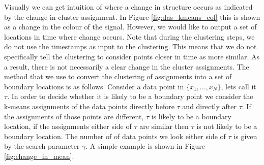Visually we can get intuition of where a change in structure occurs as indicated by the change in cluster assignment. In Figure \ref{fig:das_kmeans_col} this is shown as a change in the colour of the signal. However, we would like to output a set of locations in time where change occurs. Note that during the clustering steps, we do not use the timestamps as input to the clustering. This means that we do not specifically tell the clustering to consider points closer in time as more similar. As a result, there is not necessarily a clear change in the cluster assignments.
The method that we use to convert the clustering of assignments into a set of boundary locations is as follows. Consider a data point in $\{ x_1, ..., x_N \}$, lets call it $\tau$. In order to decide whether it is likely to be a boundary point we consider the k-means assignments of the data points directly before $\tau$ and directly after $\tau$. If the assignments of those points are different, $\tau$ is likely to be a boundary location, if the assignments either side of $\tau$ are similar then $\tau$ is not likely to be a boundary location. The number of of data points we look either side of $\tau$ is given by the search parameter $\gamma$. A simple example is shown in Figure \ref{fig:change_in_mean}.


